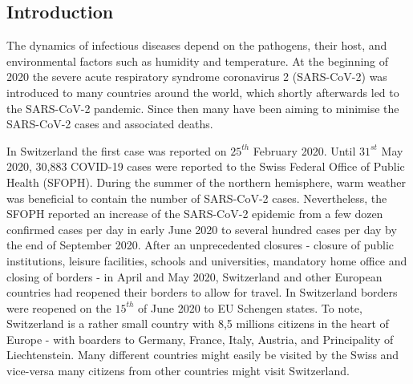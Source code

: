 \documentclass[10pt, a4paper, twoside]{article}
\begin{document}
\begin{multicols}{2}
\section{Introduction}

\lhead{ }
The dynamics of infectious diseases depend on the pathogens, their host, and environmental factors such as humidity and temperature.\cite{leung_transmissibility_2020} 
At the beginning of 2020 the severe acute respiratory syndrome coronavirus 2 (SARS-CoV-2) was introduced to many countries around the world, which shortly afterwards led to the SARS-CoV-2 pandemic.
Since then many have been aiming to minimise the SARS-CoV-2 cases and associated deaths.

In Switzerland the first case was reported on $25^{th}$ February 2020.%
Until $31^{st}$ May 2020, 30,883 COVID-19 cases were reported to the Swiss Federal Office of Public Health (SFOPH). %
During the summer of the northern hemisphere, warm weather was beneficial to contain the number of SARS-CoV-2 cases.\cite{neher_potential_2020} 
Nevertheless, the SFOPH reported an increase of the SARS-CoV-2 epidemic from a few dozen confirmed cases per day in early June 2020 to several hundred cases per day by the end of September 2020.
After an unprecedented closures - closure of public institutions, leisure facilities, schools and universities, mandatory home office and closing of borders -  in April and May 2020, Switzerland and other European countries had reopened their borders to allow for travel. 
In Switzerland borders were reopened on the $15^{th}$ of June 2020 to EU Schengen states. 
To note, Switzerland is a rather small country with 8,5 millions citizens in the heart of Europe - with boarders to Germany, France, Italy, Austria, and Principality of Liechtenstein.
Many different countries might easily be visited by the Swiss and vice-versa many citizens from other countries might visit Switzerland. 


\end{multicols}
\end{document}
